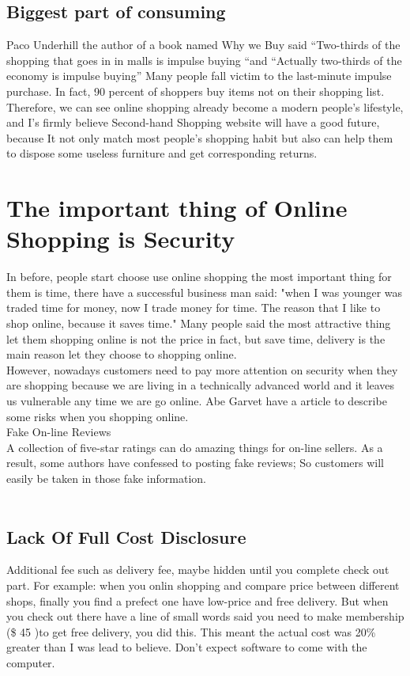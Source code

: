\subsection{Biggest part of consuming}  
Paco Underhill \cite{14} the author of a book named Why we Buy said “Two-thirds of the shopping that goes in in malls is impulse buying “and  “Actually two-thirds of the economy is impulse buying”
Many people fall victim to the last-minute impulse purchase. In fact, 90 percent of shoppers buy items not on their shopping list. 
Therefore, we can see online shopping already become a modern people’s lifestyle, and I’s firmly believe Second-hand Shopping website will have a good future, because It not only match most people’s shopping habit but also can help them to dispose some useless furniture and get corresponding returns.
\\
\section{The important thing of Online Shopping is Security} 
In before, people start choose use online shopping the most important thing for them is time, there have a successful business man said: "when I was younger was traded time for money, now I trade money for time. The reason that I like to shop online, because it saves time." Many people said the most attractive thing let them shopping online is not the price in fact, but save time, delivery is the main reason let they choose to shopping online.\\
However, nowadays customers need to pay more attention on security when they are shopping because we are living in a technically advanced world and it leaves us vulnerable any time we are go online. Abe Garvet have a article to describe some risks when you shopping online.\cite{15}\\
Fake On-line Reviews\\
A collection of five-star ratings can do amazing things for on-line sellers. As a result, some authors have confessed to posting fake reviews; So customers will easily be taken in those fake information.\\
\\
\subsection{Lack Of Full Cost Disclosure }
Additional fee such as delivery fee, maybe hidden until you complete check out part. For example: when you onlin shopping and compare price between different shops, finally you find a prefect one have low-price and free delivery. But when you check out there have a line of small words said you need to make membership (\$ 45 )to get free delivery, you did this. This meant the actual cost was 20\% greater than I was lead to believe. Don't expect software to come with the computer.
\\
